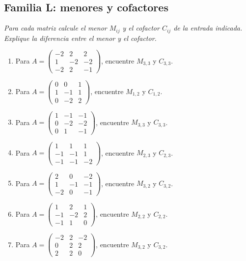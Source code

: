 \documentclass[12pt]{article}
\theoremstyle{remark}
\newcounter{contadorEjercicio}
\newenvironment{listaejercicios}{\begin{enumerate}[label=\textbf{E\arabic*.},leftmargin=2.4em,itemsep=0.52em]\setcounter{enumi}{\value{contadorEjercicio}}}{\setcounter{contadorEjercicio}{\value{enumi}}\end{enumerate}}
\begin{document}
\subsection{Familia L: menores y cofactores}\noindent\textit{Para cada matriz calcule el menor $M_{ij}$ y el cofactor $C_{ij}$ de la entrada indicada. Explique la diferencia entre el menor y el cofactor.}\par\medskip
\begin{listaejercicios}

\item Para $A=\begin{pmatrix}-2&2&2\\1&-2&-2\\-2&2&-1\end{pmatrix}$, encuentre $M_{3,3}$ y $C_{3,3}$.

\item Para $A=\begin{pmatrix}0&0&1\\1&-1&1\\0&-2&2\end{pmatrix}$, encuentre $M_{1,2}$ y $C_{1,2}$.

\item Para $A=\begin{pmatrix}1&-1&-1\\0&-2&-2\\0&1&-1\end{pmatrix}$, encuentre $M_{3,3}$ y $C_{3,3}$.

\item Para $A=\begin{pmatrix}1&1&1\\-1&-1&1\\-1&-1&-2\end{pmatrix}$, encuentre $M_{2,3}$ y $C_{2,3}$.

\item Para $A=\begin{pmatrix}2&0&-2\\1&-1&-1\\-2&0&-1\end{pmatrix}$, encuentre $M_{3,2}$ y $C_{3,2}$.

\item Para $A=\begin{pmatrix}1&2&1\\-1&-2&2\\-1&1&0\end{pmatrix}$, encuentre $M_{2,2}$ y $C_{2,2}$.

\item Para $A=\begin{pmatrix}-2&2&-2\\0&2&2\\2&2&0\end{pmatrix}$, encuentre $M_{3,2}$ y $C_{3,2}$.


\end{listaejercicios}
\end{document}
